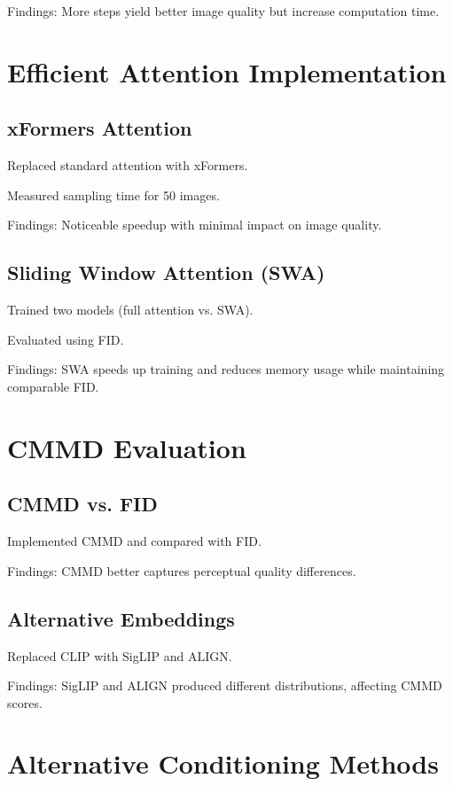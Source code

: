 \documentclass{article}
\begin{document}
Findings: More steps yield better image quality but increase computation time.


\section{Efficient Attention Implementation}
\subsection{xFormers Attention}

Replaced standard attention with xFormers.

Measured sampling time for 50 images.

Findings: Noticeable speedup with minimal impact on image quality.

\subsection{Sliding Window Attention (SWA)}

Trained two models (full attention vs. SWA).

Evaluated using FID.

Findings: SWA speeds up training and reduces memory usage while maintaining comparable FID.

\section{CMMD Evaluation}
\subsection{CMMD vs. FID}

Implemented CMMD and compared with FID.

Findings: CMMD better captures perceptual quality differences.

\subsection{Alternative Embeddings}

Replaced CLIP with SigLIP and ALIGN.

Findings: SigLIP and ALIGN produced different distributions, affecting CMMD scores.

\section{Alternative Conditioning Methods}
\end{document}
